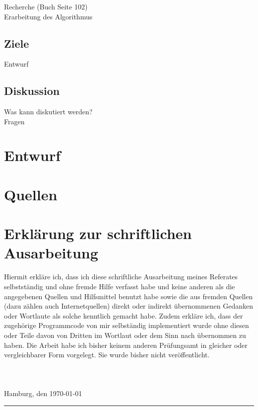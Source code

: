 \documentclass[11pt]{article}
\begin{document}
    \subsubsection{}
    Recherche (Buch Seite 102)~\cite{grbuch} \\
    Erarbeitung des Algorithmus\\

    \subsection{Ziele}
    Entwurf

    \subsection{Diskussion}
    Was kann diskutiert werden?\\
    Fragen

    \section{Entwurf}

    \section{Quellen}
    
    

    \newpage

    \section{Erkl\"arung zur schriftlichen Ausarbeitung}

    Hiermit erkl\"are ich, dass ich diese schriftliche Ausarbeitung meines Referates selbstst\"andig und ohne fremde Hilfe verfasst habe und keine anderen als die angegebenen Quellen und Hilfsmittel benutzt habe sowie die aus fremden Quellen (dazu z\"ahlen auch Internetquellen) direkt oder indirekt \"ubernommenen Gedanken oder Wortlaute als solche kenntlich gemacht habe. Zudem erkl\"are ich, dass der zugeh\"orige Programmcode von mir selbst\"andig implementiert wurde ohne diesen oder Teile davon von Dritten im Wortlaut oder dem Sinn nach \"ubernommen zu haben. Die Arbeit habe ich bisher keinem anderen Pr\"ufungsamt in gleicher oder vergleichbarer Form vorgelegt. Sie wurde bisher nicht ver\"offentlicht.\\ \\ \\ \\
    Hamburg, den \today \indent\rule{8.5cm}{0.4pt}
\end{document}
